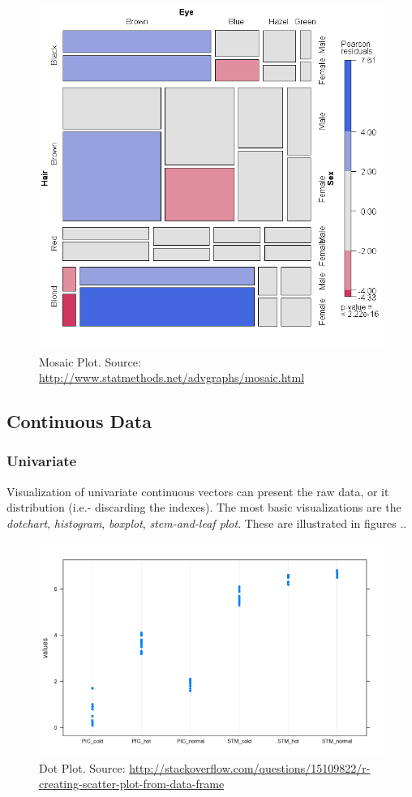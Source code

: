 \documentclass[12pt,a4paper]{report}
\begin{document}
\begin{figure}
\centering
\includegraphics[width=0.7\linewidth]{art/mosaic1}
\caption[Mosaic Plot]{Mosaic Plot. Source: \url{http://www.statmethods.net/advgraphs/mosaic.html}}
\label{fig:mosaic}
\end{figure}



\subsection{Continuous Data}




\subsubsection{Univariate}
Visualization of univariate continuous vectors can present the raw data, or it distribution (i.e.- discarding the indexes).
The most basic visualizations are the \emph{dotchart}, \emph{histogram}, \emph{boxplot}, \emph{stem-and-leaf plot}. 
These are illustrated in figures ..


 
\begin{figure}
\centering
\includegraphics[width=0.7\linewidth]{art/lmCm0}
\caption[Dot Plot]{Dot Plot. Source: \url{http://stackoverflow.com/questions/15109822/r-creating-scatter-plot-from-data-frame}}
\label{fig:dot_plot}
\end{figure}
\end{document}
